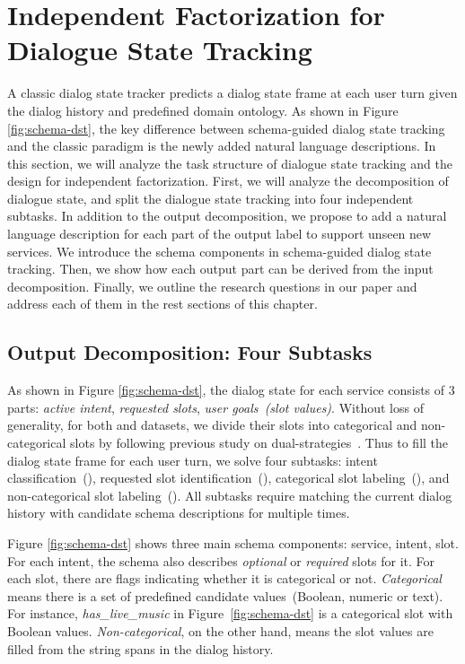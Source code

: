 \section{Independent Factorization for Dialogue State Tracking}
\label{sec:sgd:ind-factorization}
A classic dialog state tracker predicts a dialog state frame at each
user turn given the dialog history and predefined domain ontology. As
shown in Figure \ref{fig:schema-dst}, the key difference between
schema-guided dialog state tracking and the classic paradigm is the
newly added natural language descriptions.  In this section, we will
analyze the task structure of dialogue state tracking and the design
for independent factorization.  First, we will analyze the
decomposition of dialogue state, and split the dialogue state tracking
into four independent subtasks. In addition to the output
decomposition, we propose to add a natural language description for
each part of the output label to support unseen new services.  We
introduce the schema components in schema-guided dialog state
tracking. Then, we show how each output part can be derived from the
input decomposition.  Finally, we outline the research questions in
our paper and address each of them in the rest sections of this
chapter.

\subsection{Output Decomposition: Four Subtasks}
\label{sec:sgd:decompose-y}
As shown in Figure \ref{fig:schema-dst}, the dialog state for each
service consists of 3 parts: {\it active intent}, {\it requested
  slots}, {\it user goals~(slot values)}. Without loss of generality,
for both \sgdst and \multiwoz datasets, we divide their slots into
categorical and non-categorical slots by following previous study on
dual-strategies~\cite{zhang2019find}. Thus to fill the dialog state
frame for each user turn, we solve four  subtasks:
intent classification~(\IC), requested slot identification~(\RSI),
categorical slot labeling~(\CSL), and non-categorical slot
labeling~(\NSL). All subtasks require matching the current dialog
history with candidate schema descriptions for multiple times.

 Figure \ref{fig:schema-dst} shows three
main schema components: service, intent, slot. For each intent, the
schema also describes {\it optional} or {\it required} slots for
it. For each slot, there are flags indicating whether it is
categorical or not. {\it Categorical} means there is a set of
predefined candidate values~(Boolean, numeric or text). For instance,
{\it has\_live\_music} in Figure~\ref{fig:schema-dst} is a categorical
slot with Boolean values. {\it Non-categorical}, on the other hand,
means the slot values are filled from the string spans in the dialog
history.


